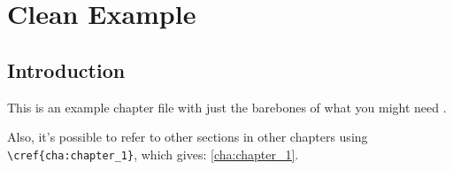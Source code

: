 \chapter{Clean Example}
\label{cha:clean-example}

\section{Introduction}
\label{sec:another-intro}

This is an example chapter file with just the barebones of what you might need \autocite{Einstein1906,Author2020}.

Also, it's possible to refer to other sections in other chapters using \verb|\cref{cha:chapter_1}|, which gives: \cref{cha:chapter_1}.

\newpage
\printbibliography[heading=subbibnumbered, segment=\therefsegment]